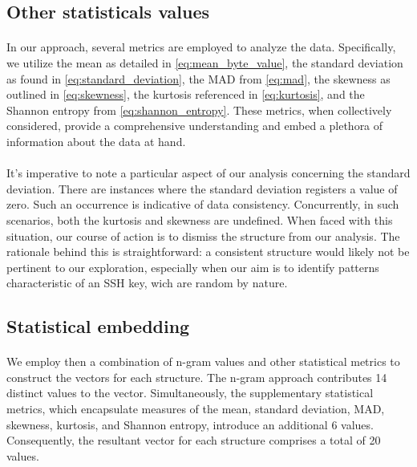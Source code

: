     \subsection{Other statisticals values}
        \paragraph{}In our approach, several metrics are employed to analyze the data. Specifically, we utilize the mean as detailed in \ref{eq:mean_byte_value}, the standard deviation as found in \ref{eq:standard_deviation}, the MAD from \ref{eq:mad}, the skewness as outlined in \ref{eq:skewness}, the kurtosis referenced in \ref{eq:kurtosis}, and the Shannon entropy from \ref{eq:shannon_entropy}. These metrics, when collectively considered, provide a comprehensive understanding and embed a plethora of information about the data at hand.

        \paragraph{}It's imperative to note a particular aspect of our analysis concerning the standard deviation. There are instances where the standard deviation registers a value of zero. Such an occurrence is indicative of data consistency. Concurrently, in such scenarios, both the kurtosis and skewness are undefined. When faced with this situation, our course of action is to dismiss the \gls{structure} from our analysis. The rationale behind this is straightforward: a consistent \gls{structure} would likely not be pertinent to our exploration, especially when our aim is to identify patterns characteristic of an SSH key, wich are random by nature.
    \subsection{Statistical embedding}
        \paragraph{}We employ then a combination of n-gram values and other statistical metrics to construct the vectors for each \gls{structure}. The n-gram approach contributes 14 distinct values to the vector. Simultaneously, the supplementary statistical metrics, which encapsulate measures of the mean, standard deviation, MAD, skewness, kurtosis, and Shannon entropy, introduce an additional 6 values. Consequently, the resultant vector for each structure comprises a total of 20 values.
    

